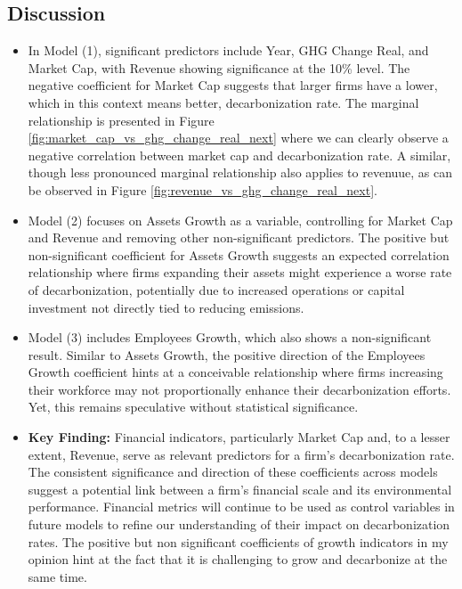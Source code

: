 \subsection{Discussion}
\begin{itemize}
    \item In Model (1), significant predictors include Year, GHG Change Real, and Market Cap, with Revenue showing significance at the 10\% level. The negative coefficient for Market Cap suggests that larger firms have a lower, which in this context means better, decarbonization rate. The marginal relationship is presented in Figure \ref{fig:market_cap_vs_ghg_change_real_next} where we can clearly observe a negative correlation between market cap and decarbonization rate. A similar, though less pronounced marginal relationship also applies to revenuue, as can be observed in Figure \ref{fig:revenue_vs_ghg_change_real_next}.
    
    \item Model (2) focuses on Assets Growth as a variable, controlling for Market Cap and Revenue and removing other non-significant predictors. The positive but non-significant coefficient for Assets Growth suggests an expected correlation relationship where firms expanding their assets might experience a worse rate of decarbonization, potentially due to increased operations or capital investment not directly tied to reducing emissions. 
    
    \item Model (3) includes Employees Growth, which also shows a non-significant result. Similar to Assets Growth, the positive direction of the Employees Growth coefficient hints at a conceivable relationship where firms increasing their workforce may not proportionally enhance their decarbonization efforts. Yet, this remains speculative without statistical significance. 
    
    \item \textbf{Key Finding:} Financial indicators, particularly Market Cap and, to a lesser extent, Revenue, serve as relevant predictors for a firm's decarbonization rate. The consistent significance and direction of these coefficients across models suggest a potential link between a firm's financial scale and its environmental performance. Financial metrics will continue to be used as control variables in future models to refine our understanding of their impact on decarbonization rates. The positive but non significant coefficients of growth indicators in my opinion hint at the fact that it is challenging to grow and decarbonize at the same time.
\end{itemize}




